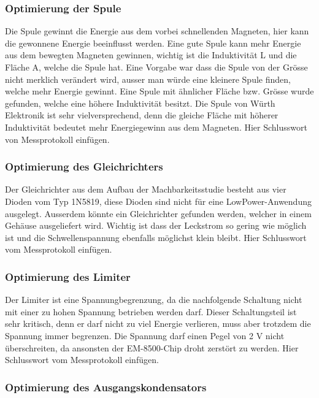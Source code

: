 \subsubsection{Optimierung der Spule}

Die Spule gewinnt die Energie aus dem vorbei schnellenden Magneten, hier kann die gewonnene Energie beeinflusst werden. Eine gute Spule kann mehr Energie aus dem bewegten Magneten gewinnen, wichtig ist die Induktivität L und die Fläche A, welche die Spule hat. Eine Vorgabe war dass die Spule von der Grösse nicht merklich verändert wird, ausser man würde eine kleinere Spule finden, welche mehr Energie gewinnt. Eine Spule mit ähnlicher Fläche bzw. Grösse wurde gefunden, welche eine höhere Induktivität besitzt. Die Spule von Würth Elektronik ist sehr vielversprechend, denn die gleiche Fläche mit höherer Induktivität bedeutet mehr Energiegewinn aus dem Magneten.
Hier Schlusswort von Messprotokoll einfügen.

\subsubsection{Optimierung des Gleichrichters}

Der Gleichrichter aus dem Aufbau der Machbarkeitsstudie besteht aus vier Dioden vom Typ 1N5819, diese Dioden sind nicht für eine LowPower-Anwendung ausgelegt. Ausserdem könnte ein Gleichrichter gefunden werden, welcher in einem Gehäuse ausgeliefert wird. Wichtig ist dass der Leckstrom so gering wie möglich ist und die Schwellenspannung ebenfalls möglichst klein bleibt. 
Hier Schlusswort vom Messprotokoll einfügen.

\subsubsection{Optimierung des Limiter}

Der Limiter ist eine Spannungbegrenzung, da die nachfolgende Schaltung nicht mit einer zu hohen Spannung betrieben werden darf. Dieser Schaltungsteil ist sehr kritisch, denn er darf nicht zu viel Energie verlieren, muss aber trotzdem die Spannung immer begrenzen. Die Spannung darf einen Pegel von 2 V nicht überschreiten, da ansonsten der EM-8500-Chip droht zerstört zu werden. 
Hier Schlusswort vom Messprotokoll einfügen.

\subsubsection{Optimierung des Ausgangskondensators}

